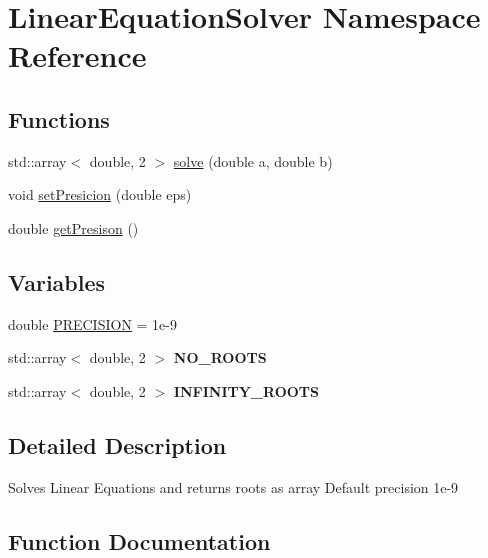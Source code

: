 \hypertarget{namespaceLinearEquationSolver}{}\section{Linear\+Equation\+Solver Namespace Reference}
\label{namespaceLinearEquationSolver}
\subsection*{Functions}
\begin{DoxyCompactItemize}
\item 
std\+::array$<$ double, 2 $>$ \hyperlink{namespaceLinearEquationSolver_a5860ff179b02727c12c41318a84079da}{solve} (double a, double b)
\item 
void \hyperlink{namespaceLinearEquationSolver_a164725181a9e9f5bf9c30409f1220279}{set\+Presicion} (double eps)
\item 
double \hyperlink{namespaceLinearEquationSolver_a915e0340ab887a3f94c990760eb476ca}{get\+Presison} ()
\end{DoxyCompactItemize}
\subsection*{Variables}
\begin{DoxyCompactItemize}
\item 
double \hyperlink{namespaceLinearEquationSolver_a68d53d56e98cc83087dcfbc7e9b0ecc7}{P\+R\+E\+C\+I\+S\+I\+ON} = 1e-\/9
\item 
std\+::array$<$ double, 2 $>$ {\bfseries N\+O\+\_\+\+R\+O\+O\+TS}
\item 
std\+::array$<$ double, 2 $>$ {\bfseries I\+N\+F\+I\+N\+I\+T\+Y\+\_\+\+R\+O\+O\+TS}
\end{DoxyCompactItemize}


\subsection{Detailed Description}
Solves Linear Equations and returns roots as array Default precision 1e-\/9 

\subsection{Function Documentation}
\mbox{\label{namespaceLinearEquationSolver_a915e0340ab887a3f94c990760eb476ca}} 
